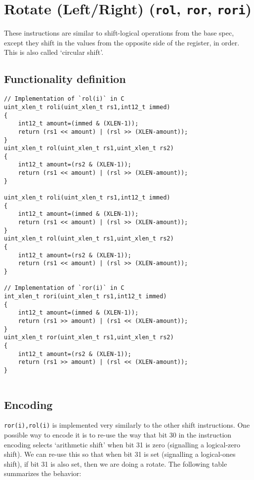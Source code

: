 
\section{Rotate (Left/Right) (\texttt{rol}, \texttt{ror}, \texttt{rori})}

These instructions are similar to shift-logical operations from the base
spec, except they shift in the values from the opposite side of the
register, in order. This is also called `circular shift'.

\subsection{Functionality definition}

\begin{verbatim}
// Implementation of `rol(i)` in C
uint_xlen_t roli(uint_xlen_t rs1,int12_t immed)
{
    int12_t amount=(immed & (XLEN-1));
    return (rs1 << amount) | (rsl >> (XLEN-amount));
}
uint_xlen_t rol(uint_xlen_t rs1,uint_xlen_t rs2)
{
    int12_t amount=(rs2 & (XLEN-1));
    return (rs1 << amount) | (rsl >> (XLEN-amount));
}   

uint_xlen_t roli(uint_xlen_t rs1,int12_t immed)
{
    int12_t amount=(immed & (XLEN-1));
    return (rs1 << amount) | (rsl >> (XLEN-amount));
}
uint_xlen_t rol(uint_xlen_t rs1,uint_xlen_t rs2)
{
    int12_t amount=(rs2 & (XLEN-1));
    return (rs1 << amount) | (rsl >> (XLEN-amount));
}   

// Implementation of `ror(i)` in C
int_xlen_t rori(uint_xlen_t rs1,int12_t immed)
{
    int12_t amount=(immed & (XLEN-1));
    return (rs1 >> amount) | (rs1 << (XLEN-amount));
}
uint_xlen_t ror(uint_xlen_t rs1,uint_xlen_t rs2)
{
    int12_t amount=(rs2 & (XLEN-1));
    return (rs1 >> amount) | (rsl << (XLEN-amount));
}
   
\end{verbatim}

\subsection{Encoding}



\texttt{ror(i),rol(i)} is implemented very similarly to the other shift
instructions. One possible way to encode it is to re-use the way that
bit 30 in the instruction encoding selects `arithmetic shift' when bit
31 is zero (signalling a logical-zero shift). We can re-use this so that
when bit 31 is set (signalling a logical-ones shift), if bit 31 is also
set, then we are doing a rotate. The following table summarizes the
behavior:

